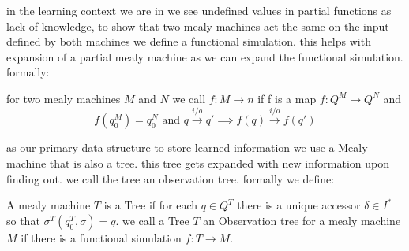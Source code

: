 in the learning context we are in we see undefined values in partial functions as lack of knowledge, to show that two mealy machines act the same on the input defined by both machines we define a functional simulation. this helps with expansion of a partial mealy machine as we can expand the functional simulation. formally:
\begin{definition}
 for two mealy machines $M$ and $N$ we call $f:M\rightarrow n$ if f is a map $f:Q^M\rightarrow Q^N$ and  $$
	f(q_0^M)=q_0^N \text{ and } q\xrightarrow{i/o}q' \implies f(q)\xrightarrow{i/o}f(q') 
 $$
\end{definition} 
as our primary data structure to store learned information we use a Mealy machine that is also a tree. this tree gets expanded with new information upon finding out. we call the tree an observation tree. formally we define:
\begin{definition}A mealy machine $T$ is a Tree if for each $q\in Q^T$ there is a unique accessor $\delta\in I^*$ so that $\sigma^T(q_0^T,\sigma)=q$. we call a Tree $T$ an Observation tree for a mealy machine $M$ if there is a functional simulation $f:T\rightarrow M$.\end{definition}



